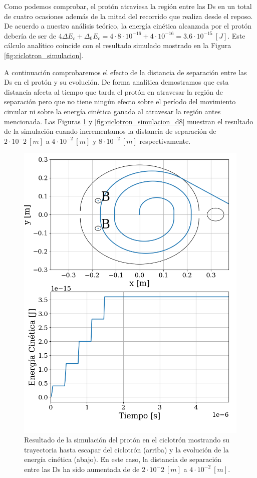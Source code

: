\documentclass[journal]{IEEEtran}
\begin{document}
\clearpage

Como podemos comprobar, el protón atraviesa la región entre las Ds en un total de cuatro ocasiones además de la mitad del recorrido que realiza desde el reposo. De acuerdo a nuestro análisis teórico, la energía cinética alcanzada por el protón debería de ser de $4\Delta E_c + \Delta_0 E_c = 4\cdot 8\cdot 10^{-16} + 4\cdot 10^{-16} = 3.6\cdot 10^{-15}~[J]$. Este cálculo analítico coincide con el resultado simulado mostrado en la Figura \ref{fig:ciclotron_simulacion}.

A continuación comprobaremos el efecto de la distancia de separación entre las Ds en el protón y su evolución. De forma analítica demostramos que esta distancia afecta al tiempo que tarda el protón en atravesar la región de separación pero que no tiene ningún efecto sobre el período del movimiento circular ni sobre la energía cinética ganada al atravesar la región antes mencionada. Las Figuras \ref{fig:ciclotron_simulacion_d4} y \ref{fig:ciclotron_simulacion_d8} muestran el resultado de la simulación cuando incrementamos la distancia de separación de $2\cdot 10^-2~[m]$ a $4\cdot 10^{-2}~[m]$ y $8\cdot 10^{-2}~[m]$ respectivamente.

\begin{figure}[!htb]
    \centering
    \includegraphics[width=0.9\linewidth]{ciclotron_simulacion_d4.png}
    \caption{Resultado de la simulación del protón en el ciclotrón mostrando su trayectoria hasta escapar del ciclotrón (arriba) y la evolución de la energía cinética (abajo). En este caso, la distancia de separación entre las Ds ha sido aumentada de de $2\cdot 10^-2~[m]$ a $4\cdot 10^{-2}~[m]$.}
    \label{fig:ciclotron_simulacion_d4}
\end{figure}
\end{document}
